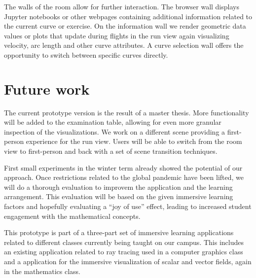 \documentclass{VRARWorkshop}
\begin{document}
The walls of the room allow for further interaction. The browser wall displays Jupyter notebooks or other webpages
containing additional information related to the current curve or exercise.
On the information wall we render geometric data values or plots that update during flights in the run view again visualizing  velocity,  arc length and other curve attributes. %
A curve selection wall offers the opportunity to switch between specific curves directly.

\section{Future work}

The current prototype version is the result of a master thesis.
More functionality will be added to the examination table, allowing for even more granular inspection of the visualizations.
We work on a different scene providing a first-person experience for the run view.
Users will be able to switch from the room view to first-person and back with a set of
scene transition techniques.

First small experiments in the winter term already showed the potential of our approach.
Once restrictions related to the global pandemic have been lifted, we will do a thorough evaluation
to improvem the application and the learning arrangement.
This evaluation will be based on the given immersive learning factors and
hopefully evaluating a "`joy of use"' effect, leading to increased student engagement with the mathematical concepts.

This prototype is part of a three-part set of immersive learning applications related to different classes currently being taught on our campus. 
This includes an existing application related to ray tracing  used in a computer graphics class and a application for the immersive  visualization of scalar and vector fields, again in the mathematics class. 

\VRARsetbibstyle

\end{document}
